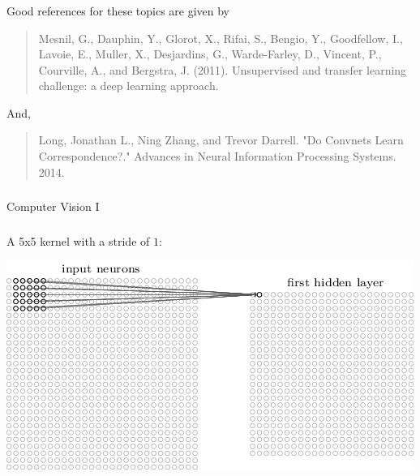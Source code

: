 \documentclass[xetex,mathserif,serif,aspectratio=169]{beamer}
\begin{document}
\begin{frame}[fragile] \frametitle{} \oldB \small


Good references for these topics are given by
\begin{quote}
Mesnil, G., Dauphin, Y., Glorot, X., Rifai, S., Bengio, Y., Goodfellow, I., Lavoie, E., Muller, X., Desjardins, G., Warde-Farley, D., Vincent, P., Courville, A., and Bergstra, J. (2011). Unsupervised and transfer learning challenge: a deep learning approach.
\end{quote}
And,
\begin{quote}
Long, Jonathan L., Ning Zhang, and Trevor Darrell. "Do Convnets Learn Correspondence?." Advances in Neural Information Processing Systems. 2014.
\end{quote}

\end{frame}



\begin{frame}[fragile] \frametitle{}

\begin{flushright}
{\color{yaleblue}\sc\fontsize{1cm}{1cm}\selectfont Computer Vision I}
\end{flushright}

\end{frame}

\begin{frame}[fragile] \frametitle{} \oldB \small


A 5x5 kernel with a stride of $1$:

\begin{center}
\includegraphics[height=0.66\textheight]{img/tikz45.png}
\end{center}

\end{frame}
\end{document}
